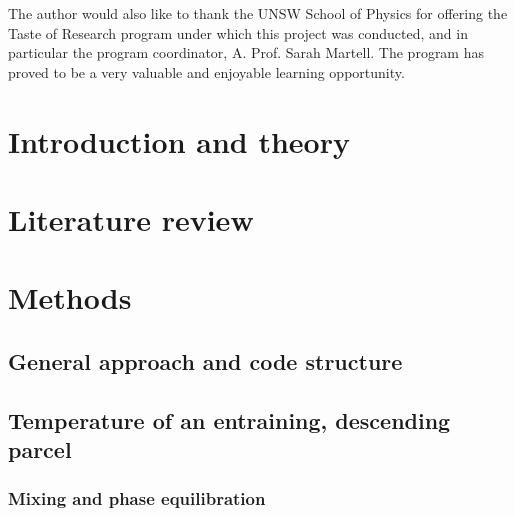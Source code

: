 \documentclass[12pt,titlepage]{article}
\begin{document}
The author would also like to thank the UNSW School of Physics for
offering the Taste of Research program under which this project was
conducted, and in particular the program coordinator, A. Prof. Sarah
Martell. The program has proved to be a very valuable and enjoyable
learning opportunity.

\tableofcontents

\clearpage
\section{Introduction and theory}

\section{Literature review}

\section{Methods}

\subsection{General approach and code structure}

\subsection{Temperature of an entraining, descending parcel}
\subsubsection*{Mixing and phase equilibration}
\end{document}
